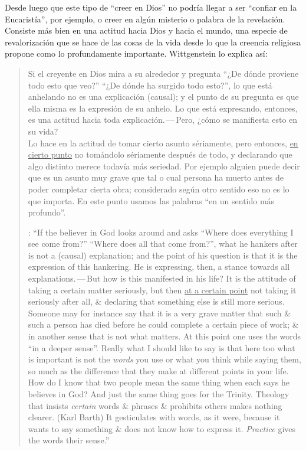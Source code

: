   Desde luego que este tipo de ``creer en Dios'' no podría llegar a ser ``confiar en la Eucaristía'', por ejemplo, o creer en algún misterio o palabra de la revelación. Consiste más bien en una actitud hacia Dios y hacia el mundo, una especie de revalorización que se hace de las cosas de la vida desde lo que la creencia religiosa propone como lo profundamente importante. Wittgenstein lo explica así: \blockquote[{\cite[96--97]{wittgenstein1998cnv}}: \enquote{If the believer in God looks around and asks ``Where does everything I see come from?'' ``Where does all that come from?'', what he hankers after is not a (causal) explanation; and the point of his question is that it is the expression of this hankering. He is expressing, then, a stance towards all explanations.\,---\,But how is this manifested in his life? It is the attitude of taking a certain matter seriously, but then \underline{at a certain point} not taking it seriously after all, \& declaring that something else is still more serious. Someone may for instance say that it is a very grave matter that such \& such a person has died before he could complete a certain piece of work; \& in another sense that is not what matters. At this point one uses the words ``in a deeper sense''. Really what I should like to say is that here too what is important is not the \emph{words} you use or what you think while saying them, so much as the difference that they make at different points in your life. How do I know that two people mean the same thing when each says he believes in God? And just the same thing goes for the Trinity. Theology that insists \emph{certain} words \& phrases \& prohibits others makes nothing clearer. (Karl Barth) It gesticulates with words, as it were, because it wants to say something \& does not know how to express it. \emph{Practice} gives the words their sense.}]{Si el creyente en Dios mira a su alrededor y pregunta ``¿De dónde proviene todo esto que veo?'' ``¿De dónde ha surgido todo esto?'', lo que está anhelando no es una explicación (causal); y el punto de su pregunta es que ella misma es la expresión de su anhelo. Lo que está expresando, entonces, es una actitud hacia toda explicación.\,---\,Pero, ¿cómo se manifiesta esto en su vida?\\

  Lo hace en la actitud de tomar cierto asunto sériamente, pero entonces, \underline{en cierto punto} no tomándolo sériamente después de todo, y declarando que algo distinto merece todavía más seriedad. Por ejemplo alguien puede decir que es un asunto muy grave que tal o cual persona ha muerto antes de poder completar cierta obra; considerado según otro sentido eso no es lo que importa. En este punto usamos las palabras ``en un sentido más profundo''.\\

}
